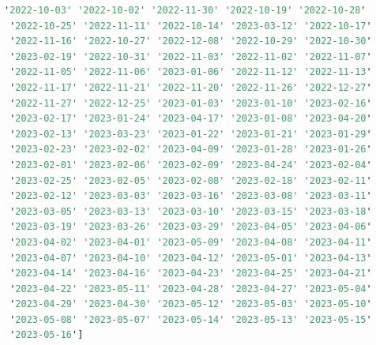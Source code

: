 \begin{lstlisting}[language=haskell, caption=Valores por columna, captionpos=b, label=lst:fiboHaskell]
 '2022-10-03' '2022-10-02' '2022-11-30' '2022-10-19' '2022-10-28'
 '2022-10-25' '2022-11-11' '2022-10-14' '2023-03-12' '2022-10-17'
 '2022-11-16' '2022-10-27' '2022-12-08' '2022-10-29' '2022-10-30'
 '2023-02-19' '2022-10-31' '2022-11-03' '2022-11-02' '2022-11-07'
 '2022-11-05' '2022-11-06' '2023-01-06' '2022-11-12' '2022-11-13'
 '2022-11-17' '2022-11-21' '2022-11-20' '2022-11-26' '2022-12-27'
 '2022-11-27' '2022-12-25' '2023-01-03' '2023-01-10' '2023-02-16'
 '2023-02-17' '2023-01-24' '2023-04-17' '2023-01-08' '2023-04-20'
 '2023-02-13' '2023-03-23' '2023-01-22' '2023-01-21' '2023-01-29'
 '2023-02-23' '2023-02-02' '2023-04-09' '2023-01-28' '2023-01-26'
 '2023-02-01' '2023-02-06' '2023-02-09' '2023-04-24' '2023-02-04'
 '2023-02-25' '2023-02-05' '2023-02-08' '2023-02-18' '2023-02-11'
 '2023-02-12' '2023-03-03' '2023-03-16' '2023-03-08' '2023-03-11'
 '2023-03-05' '2023-03-13' '2023-03-10' '2023-03-15' '2023-03-18'
 '2023-03-19' '2023-03-26' '2023-03-29' '2023-04-05' '2023-04-06'
 '2023-04-02' '2023-04-01' '2023-05-09' '2023-04-08' '2023-04-11'
 '2023-04-07' '2023-04-10' '2023-04-12' '2023-05-01' '2023-04-13'
 '2023-04-14' '2023-04-16' '2023-04-23' '2023-04-25' '2023-04-21'
 '2023-04-22' '2023-05-11' '2023-04-28' '2023-04-27' '2023-05-04'
 '2023-04-29' '2023-04-30' '2023-05-12' '2023-05-03' '2023-05-10'
 '2023-05-08' '2023-05-07' '2023-05-14' '2023-05-13' '2023-05-15'
 '2023-05-16']


\end{lstlisting}
